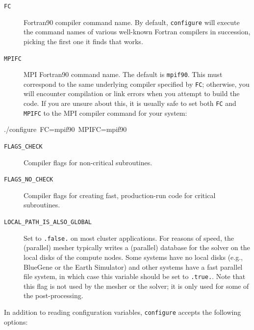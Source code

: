\documentclass[oneside,english]{book}
\newenvironment{lyxcode}
{\begin{list}{}{
\setlength{\rightmargin}{\leftmargin}
\setlength{\listparindent}{0pt}%
\raggedright
\setlength{\itemsep}{0pt}
\setlength{\parsep}{0pt}
\normalfont\ttfamily}%
 \item[]}
{\end{list}}
\begin{document}
\begin{description}
\item [{\texttt{FC}}] Fortran90 compiler command name. By default, \texttt{configure}
will execute the command names of various well-known Fortran compilers
in succession, picking the first one it finds that works.
\item [{\texttt{MPIFC}}] MPI Fortran90 command name. The default is \texttt{mpif90}.
This must correspond to the same underlying compiler specified by
\texttt{FC}; otherwise, you will encounter compilation or link errors
when you attempt to build the code. If you are unsure about this,
it is usually safe to set both \texttt{FC} and \texttt{MPIFC} to the
MPI compiler command for your system:
\end{description}
\begin{lyxcode}
./configure~FC=mpif90~MPIFC=mpif90
\end{lyxcode}
\begin{description}
\item [{\texttt{FLAGS\_CHECK}}] Compiler flags for non-critical subroutines.
\item [{\texttt{FLAGS\_NO\_CHECK}}] Compiler flags for creating fast, production-run
code for critical subroutines.
\item [{\texttt{LOCAL\_PATH\_IS\_ALSO\_GLOBAL}}] Set to \texttt{.false.}
on most cluster applications. For reasons of speed, the (parallel)
mesher typically writes a (parallel) database for the solver on the
local disks of the compute nodes. Some systems have no local disks
(e.g., BlueGene or the Earth Simulator) and other systems have a fast
parallel file system, in which case this variable should be set to
\texttt{.true.}. Note that this flag is not used by the mesher or
the solver; it is only used for some of the post-processing.
\end{description}
In addition to reading configuration variables, \texttt{configure}
accepts the following options:
\end{document}
